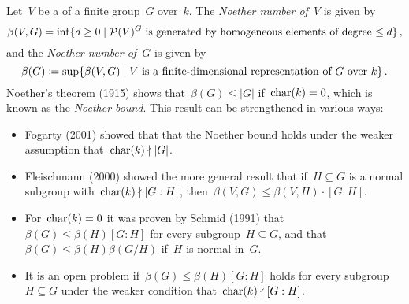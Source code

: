 \begin{remark}
  Let~$V$ be a {\fd} of a finite group~$G$ over~$k$.
  The \emph{Noether number of~$V$} is given by
  \[
    \beta(V,G)
      =
    \inf
    \{
      d \geq 0
    \suchthat
      \text{$\Pol(V)^G$ is generated by homogeneous elements of degree~$\leq d$}
    \} \,,
  \]
  and the \emph{Noether number of~$G$} is given by
  \[
    \beta(G)
      \defined
    \sup
    \{
      \beta(V,G)
    \suchthat
      \text{$V$ is a {\fd} representation of~$G$ over~$k$}
    \} \,.
  \]
  Noether’s theorem (1915) shows that~$\beta(G) \leq |G|$ if~$\operatorname{char}(k) = 0$, which is known as the \emph{Noether bound}.
  This result can be strengthened in various ways:
  \begin{itemize}
    \item
      Fogarty (2001) showed that that the Noether bound holds under the weaker assumption that~$\operatorname{char}(k) \nmid \lvert G\rvert$.
    \item
      Fleischmann (2000) showed the more general result that if~$H \subseteq G$ is a normal subgroup with~$\operatorname{char}(k) \nmid [G : H]$, then~$\beta(V,G) \leq \beta(V,H) \cdot [G : H]$.
    \item
      For~$\operatorname{char}(k) = 0$ it was proven by Schmid (1991) that~$\beta(G) \leq \beta(H)[G : H]$ for every subgroup~$H \subseteq G$, and that~$\beta(G) \leq \beta(H)\beta(G/H)$ if~$H$ is normal in~$G$.
    \item
      It is an open problem if~$\beta(G) \leq \beta(H)[G : H]$ holds for every subgroup~$H \subseteq G$ under the weaker condition that~$\operatorname{char}(k) \nmid [G : H]$.
  \end{itemize}
\end{remark}





